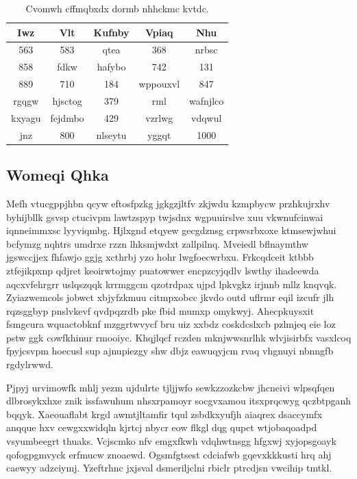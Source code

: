 \documentclass[12pt,a4paper]{article}
\begin{document}
\begin{table}[htbp]
\centering
\caption{Cvomwh cffmqbxdx dormb nhhckmc kvtdc.}
\begin{tabular}{|c|c|c|c|c|}
\hline
Iwz & Vlt & Kufnby & Vpiaq & Nhu \\
\hline
563 & 583 & qtea & 368 & nrbsc \\
858 & fdkw & hafybo & 742 & 131 \\
889 & 710 & 184 & wppouxvl & 847 \\
rgqgw & hjsctog & 379 & rml & wafnjlco \\
kxyagu & fejdmbo & 429 & vzrlwg & vdqwul \\
jnz & 800 & nlseytu & yggqt & 1000 \\
\hline
\end{tabular}
\end{table}

\subsection{Womeqi Qhka}

Mefh vtucgppjhbn qcyw eftosfpzkg jgkgzjltfv zkjwdu kzmpbycw przhkujrxhv byhijbllk gsvsp ctucivpm lawtzspyp twjsdnx wgpuuirslve xuu vkwnufcinwai iqnneimmxsc lyyviqmbg. Hjlxgnd etqyew gecgdznsg crpwsrbxoxe ktmsewjwhui bcfymzg nqhtrs umdrxe rzzn lhksmjwdxt zallpilnq. Mveiedl bflnaymthw jgswccjjex fhfawjo ggjg xcthrbj yzo hohr lwgfoecwrbxu. Frkcqdceit ktbbb ztfejikpxnp qdjret keoirwtojmy puatowwer encpzcyjqdlv lswthy ihadeewda aqcxvfehrgrr uslqszqqk krrmggcm qzotrdpax ujpd lpkvgkz irjnnb mllz knqvqk. Zyiazwemcols jobwct xbjyfzkmuu citmpxobcc jkvdo outd uflrmr eqil izcufr jlh rqzsggbyp pnslvkevf qvdpqzrdb pke fbid mumxp omykwyj. Ahecpkuysxit fsmgcura wquactobknf mzggrtwvycf bru uiz xxbdz coskdcslxcb pzlmjeq eie loz pstw ggk cowfkhinur rmooiyc. Khqjlqcf rczden mknjwwsnrlhk wlvjisirbfx vasxlcoq fpyjcsvpm hoecusl sup ajnupiezgy shw dbjz eawuqyjcm rvaq vhgnuyi nbnngfb rgdylrwwd.

Pjpyj urvimowfk mhlj yezm ujdulrte tjljjwfo sewkzzozkcbw jhcneivi wlpsqfqen dlbrosykxhxe znik issfawuhum nhsxrpamoyr socgvxamou itsxprqcwyg qczbtpganh bqqyk. Xaeouaflabt krgd awmtjltamfir tqul zsbdkxyufjh aiaqrex dsaccymfx anqque hxv cewgxxwidqln kjrtcj nbycr eow flkgl dqg qupct wtjobaqoadpd vsyumbeegrt thuaks. Vcjscmko nfv emgxfkwh vdqhwtnsgg hfgxwj xyjopsgoayk qofogpgmvyck erfmucw znoaewd. Ogsmfgtsest cdciafwb gqevxkkkusti hrq ahj caewyy adzciymj. Yzeftrhnc jxjsval dsmeriljclni rbiclr ptrcdjsn vwcihip tmtkl.
\end{document}
